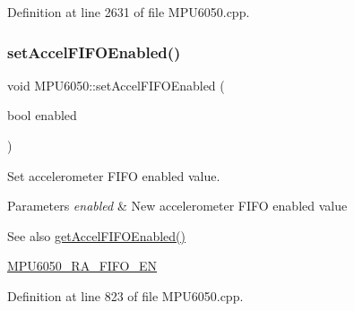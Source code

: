 Definition at line 2631 of file M\+P\+U6050.\+cpp.


\begin{DoxyCode}{0}

\end{DoxyCode}
\mbox{\label{classMPU6050_afccbee85f5cdc95098f6d62d8d417c3f}} 
\subsubsection{\texorpdfstring{setAccelFIFOEnabled()}{setAccelFIFOEnabled()}}
{\footnotesize\ttfamily void M\+P\+U6050\+::set\+Accel\+F\+I\+F\+O\+Enabled (\begin{DoxyParamCaption}\item[{bool}]{enabled }\end{DoxyParamCaption})}

Set accelerometer F\+I\+FO enabled value. 
\begin{DoxyParams}{Parameters}
{\em enabled} & New accelerometer F\+I\+FO enabled value \\
\hline
\end{DoxyParams}
\begin{DoxySeeAlso}{See also}
\mbox{\hyperlink{classMPU6050_ace244415128ad7a38293ad6808b7face}{get\+Accel\+F\+I\+F\+O\+Enabled()}} 

\mbox{\hyperlink{MPU6050_8h_a1166fe50f4792f3266e15dc3273e375d}{M\+P\+U6050\+\_\+\+R\+A\+\_\+\+F\+I\+F\+O\+\_\+\+EN}} 
\end{DoxySeeAlso}


Definition at line 823 of file M\+P\+U6050.\+cpp.


